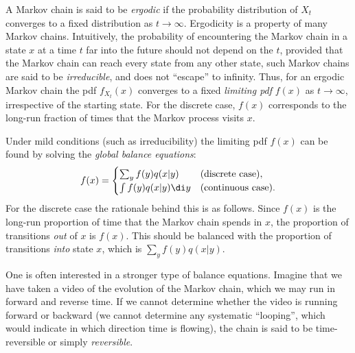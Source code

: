A Markov chain is said to be \textit{ergodic} if the probability distribution of $X_t$ converges to a fixed distribution as $t \to \infty$. Ergodicity is a property of many Markov chains. Intuitively, the probability of encountering the Markov chain in a state $x$ at a time $t$ far into the future should not depend on the $t$, provided that the Markov chain can reach every state from any other state, such Markov chains are said to be \textit{irreducible}, and does not ``escape'' to infinity. Thus, for an ergodic Markov chain the pdf $f_{X_t}(x)$ converges to a fixed \textit{limiting pdf} $f(x)$ as $t \to \infty$, irrespective of the starting state. For the discrete case, $f(x)$ corresponds to the long-run fraction of times that the Markov process visits $x$.

Under mild conditions (such as irreducibility) the limiting pdf $f(x)$ can be found by solving the \textit{global balance equations}:
\begin{equation} \label{eq:GlobalBalance}
	f(x) = \begin{cases} \sum_y f(y)q(x|y) & (\text{discrete case}), \\ \int f(y)q(x|y) \di y & (\text{continuous case}). \end{cases}
\end{equation}
For the discrete case the rationale behind this is as follows. Since $f(x)$ is the long-run proportion of time that the Markov chain spends in $x$, the proportion of transitions \textit{out} of $x$ is $f(x)$. This should be balanced with the proportion of transitions \textit{into} state $x$, which is $\sum_y f(y)q(x|y)$.

One is often interested in a stronger type of balance equations. Imagine that we have taken a video of the evolution of the Markov chain, which we may run in forward and reverse time. If we cannot determine whether the video is running forward or backward (we cannot determine any systematic ``looping'', which would indicate in which direction time is flowing), the chain is said to be time-reversible or simply \textit{reversible}.

